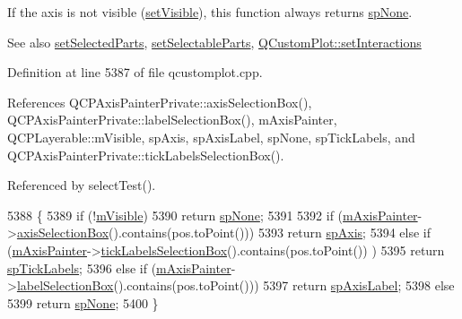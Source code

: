 If the axis is not visible (\hyperlink{class_q_c_p_layerable_a3bed99ddc396b48ce3ebfdc0418744f8}{set\+Visible}), this function always returns \hyperlink{class_q_c_p_axis_abee4c7a54c468b1385dfce2c898b115fae0df8123a5528d5ccf87cb7794f971ea}{sp\+None}.

\begin{DoxySeeAlso}{See also}
\hyperlink{class_q_c_p_axis_ab9d7a69277dcbed9119b3c1f25ca19c3}{set\+Selected\+Parts}, \hyperlink{class_q_c_p_axis_a513f9b9e326c505d9bec54880031b085}{set\+Selectable\+Parts}, \hyperlink{class_q_custom_plot_a5ee1e2f6ae27419deca53e75907c27e5}{Q\+Custom\+Plot\+::set\+Interactions} 
\end{DoxySeeAlso}


Definition at line 5387 of file qcustomplot.\+cpp.



References Q\+C\+P\+Axis\+Painter\+Private\+::axis\+Selection\+Box(), Q\+C\+P\+Axis\+Painter\+Private\+::label\+Selection\+Box(), m\+Axis\+Painter, Q\+C\+P\+Layerable\+::m\+Visible, sp\+Axis, sp\+Axis\+Label, sp\+None, sp\+Tick\+Labels, and Q\+C\+P\+Axis\+Painter\+Private\+::tick\+Labels\+Selection\+Box().



Referenced by select\+Test().


\begin{DoxyCode}
5388 \{
5389   \textcolor{keywordflow}{if} (!\hyperlink{class_q_c_p_layerable_a62e3aed8427d6ce3ccf716f285106cb3}{mVisible})
5390     \textcolor{keywordflow}{return} \hyperlink{class_q_c_p_axis_abee4c7a54c468b1385dfce2c898b115fae0df8123a5528d5ccf87cb7794f971ea}{spNone};
5391   
5392   \textcolor{keywordflow}{if} (\hyperlink{class_q_c_p_axis_aeeae00935bd2dab82d64f32544a90913}{mAxisPainter}->\hyperlink{class_q_c_p_axis_painter_private_aaf93529ac60215ea020cdff5635c3e80}{axisSelectionBox}().contains(pos.toPoint()))
5393     \textcolor{keywordflow}{return} \hyperlink{class_q_c_p_axis_abee4c7a54c468b1385dfce2c898b115fa8949d2c1a31eccae9be7ed32e7a1ae38}{spAxis};
5394   \textcolor{keywordflow}{else} \textcolor{keywordflow}{if} (\hyperlink{class_q_c_p_axis_aeeae00935bd2dab82d64f32544a90913}{mAxisPainter}->\hyperlink{class_q_c_p_axis_painter_private_af02fc189ab8460c202eb4138c9aca516}{tickLabelsSelectionBox}().contains(pos.toPoint())
      )
5395     \textcolor{keywordflow}{return} \hyperlink{class_q_c_p_axis_abee4c7a54c468b1385dfce2c898b115fa584e0a3dc4d064880647619f4bd4e771}{spTickLabels};
5396   \textcolor{keywordflow}{else} \textcolor{keywordflow}{if} (\hyperlink{class_q_c_p_axis_aeeae00935bd2dab82d64f32544a90913}{mAxisPainter}->\hyperlink{class_q_c_p_axis_painter_private_ae907476bf8cf0ecd17620575e17c06b1}{labelSelectionBox}().contains(pos.toPoint()))
5397     \textcolor{keywordflow}{return} \hyperlink{class_q_c_p_axis_abee4c7a54c468b1385dfce2c898b115fa851e0600e0d08b4f5fee9361e3fedabd}{spAxisLabel};
5398   \textcolor{keywordflow}{else}
5399     \textcolor{keywordflow}{return} \hyperlink{class_q_c_p_axis_abee4c7a54c468b1385dfce2c898b115fae0df8123a5528d5ccf87cb7794f971ea}{spNone};
5400 \}
\end{DoxyCode}


